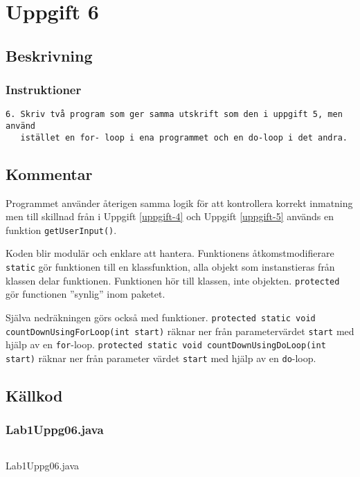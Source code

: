 \section{Uppgift 6}\label{uppgift-6}

\subsection{Beskrivning}
\subsubsection*{Instruktioner}
\begin{verbatim}
6. Skriv två program som ger samma utskrift som den i uppgift 5, men använd
   istället en for- loop i ena programmet och en do-loop i det andra.
\end{verbatim}

\subsection{Kommentar}
Programmet använder återigen samma logik för att kontrollera korrekt inmatning
men till skillnad från i Uppgift \ref{uppgift-4} och Uppgift \ref{uppgift-5}
används en funktion \texttt{getUserInput()}.
\par Koden blir modulär och enklare att hantera. Funktionens åtkomstmodifierare
\texttt{static} gör funktionen till en klassfunktion, alla objekt som instanstieras
från klassen delar funktionen. Funktionen hör till klassen, inte objekten.
\texttt{protected} gör functionen ''synlig'' inom paketet.
\par Själva nedräkningen görs också med funktioner. 
\texttt{protected static void countDownUsingForLoop(int start)} räknar ner från
parametervärdet \texttt{start} med hjälp av en \texttt{for}-loop.
\texttt{protected static void countDownUsingDoLoop(int start)} räknar ner från
parameter värdet \texttt{start} med hjälp av en \texttt{do}-loop.


\subsection{Källkod}\label{uppgift-6_src}
\subsubsection*{Lab1Uppg06.java}
    \inputminted[linenos]{java}{src/Lab1Uppg06.java}
    \caption{Lab1Uppg06.java}
    \label{Uppg6src}

